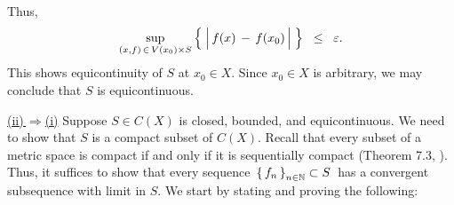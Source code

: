 Thus,
\begin{equation*}
\underset{(x,f)\,\in\,V(x_{0}) \times S}{\sup}
\left\{\;
\left\vert\,\overset{{\color{white}.}}{f}(x) \,-\, f(x_{0})\,\right\vert
\;\right\}
\;\; \leq \;\; \varepsilon.
\end{equation*}
This shows equicontinuity of $S$ at $x_{0} \in X$.
Since $x_{0} \in X$ is arbitrary, we may conclude that $S$ is equicontinuous.

\vskip 0.3cm
\noindent
\underline{(ii)\,\;$\Longrightarrow$\;(i)}
\vskip 0.1cm
\noindent
Suppose $S \in C(X)$ is closed, bounded, and equicontinuous.
We need to show that $S$ is a compact subset of $C(X)$.
Recall that every subset of a metric space is compact if and only if
it is sequentially compact (Theorem 7.3, \cite{Aliprantis1998}).
Thus, it suffices to show that every sequence
\,$\left\{\,f_{n}\,\right\}_{n\in\mathbb{N}} \subset S$\,
has a convergent subsequence with limit in $S$.
We start by stating and proving the following:

